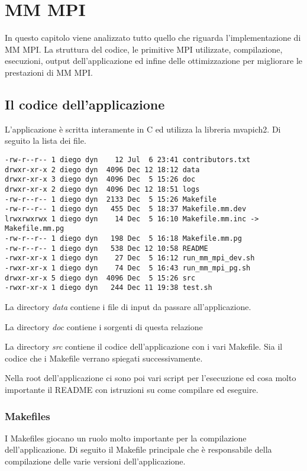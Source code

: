 \chapter{MM MPI}
In questo capitolo viene analizzato tutto quello che riguarda l'implementazione di MM MPI. La struttura del codice, le primitive MPI utilizzate, compilazione, esecuzioni, output dell'applicazione ed infine delle ottimizzazione per migliorare le prestazioni di MM MPI.

\section{Il codice dell'applicazione}
L'applicazione \`{e} scritta interamente in C ed utilizza la libreria mvapich2. Di seguito la lista dei file.

\begin{lstlisting}
-rw-r--r-- 1 diego dyn    12 Jul  6 23:41 contributors.txt
drwxr-xr-x 2 diego dyn  4096 Dec 12 18:12 data
drwxr-xr-x 3 diego dyn  4096 Dec  5 15:26 doc
drwxr-xr-x 2 diego dyn  4096 Dec 12 18:51 logs
-rw-r--r-- 1 diego dyn  2133 Dec  5 15:26 Makefile
-rw-r--r-- 1 diego dyn   455 Dec  5 18:37 Makefile.mm.dev
lrwxrwxrwx 1 diego dyn    14 Dec  5 16:10 Makefile.mm.inc -> Makefile.mm.pg
-rw-r--r-- 1 diego dyn   198 Dec  5 16:18 Makefile.mm.pg
-rw-r--r-- 1 diego dyn   538 Dec 12 10:58 README
-rwxr-xr-x 1 diego dyn    27 Dec  5 16:12 run_mm_mpi_dev.sh
-rwxr-xr-x 1 diego dyn    74 Dec  5 16:43 run_mm_mpi_pg.sh
drwxr-xr-x 5 diego dyn  4096 Dec  5 15:26 src
-rwxr-xr-x 1 diego dyn   244 Dec 11 19:38 test.sh
\end{lstlisting}

La directory \textit{data} contiene i file di input da passare all'applicazione.

La directory \textit{doc} contiene i sorgenti di questa relazione

La directory \textit{src} contiene il codice dell'applicazione con i vari Makefile. Sia il codice che i Makefile verrano spiegati successivamente.

Nella root dell'applicazione ci sono poi vari script per l'esecuzione ed cosa molto importante il README con istruzioni su come compilare ed eseguire.

\subsection{Makefiles}
I Makefiles giocano un ruolo molto importante per la compilazione dell'applicazione. Di seguito il Makefile principale che \`{e} responsabile della compilazione delle varie versioni dell'applicazione.

